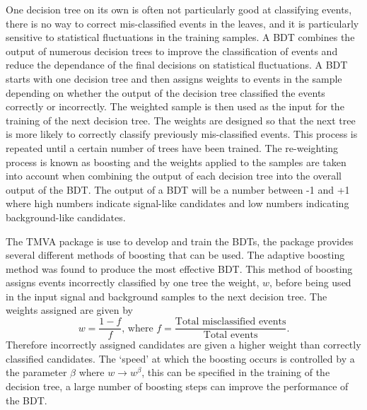 One decision tree on its own is often not particularly good at classifying events, there is no way to correct mis-classified events in the leaves, and it is particularly sensitive to statistical fluctuations in the training samples. A BDT combines the output of numerous decision trees to improve the classification of events and reduce the dependance of the final decisions on statistical fluctuations. A BDT starts with one decision tree and then assigns weights to events in the sample depending on whether the output of the decision tree classified the events correctly or incorrectly. The weighted sample is then used as the input for the training of the next decision tree. The weights are designed so that the next tree is more likely to correctly classify previously mis-classified events. This process is repeated until a certain number of trees have been trained. The re-weighting process is known as boosting and the weights applied to the samples are taken into account when combining the output of each decision tree into the overall output of the BDT. The output of a BDT will be a number between -1 and +1 where high numbers indicate signal-like candidates and low numbers indicating background-like candidates.


The TMVA package is use to develop and train the BDTs, the package provides several different methods of boosting that can be used. The adaptive boosting method was found to produce the most effective BDT.
This method of boosting assigns events incorrectly classified by one tree the weight, $w$, before being used in the input signal and background samples to the next decision tree. The weights assigned are given by
\begin{equation}
w = \frac{1 - f}{f}\text{, where } f = \frac{\text{Total misclassified events}}{\text{Total events}}.
\end{equation}
Therefore incorrectly assigned candidates are given a higher weight than correctly classified candidates. The `speed’ at which the boosting occurs is controlled by a the parameter $\beta$ where $w \rightarrow w^{\beta}$, this can be specified in the training of the decision tree, a large number of boosting steps can improve the performance of the BDT.

